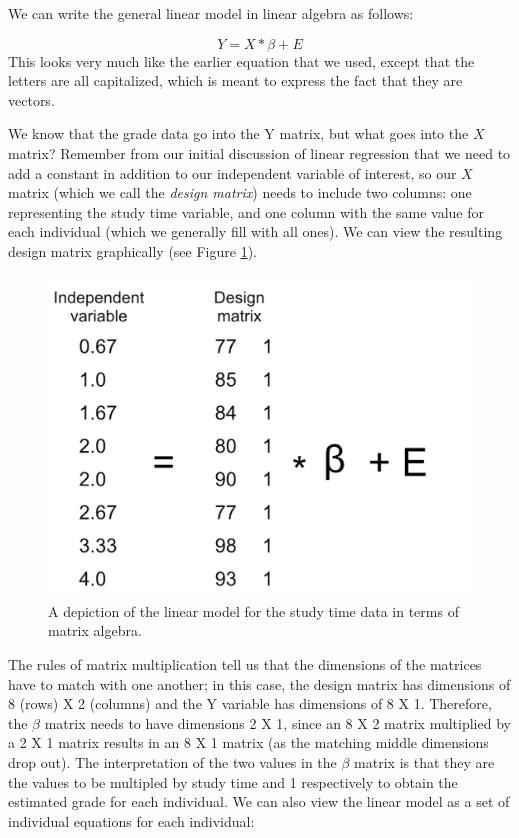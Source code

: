 \documentclass[12pt,]{book}
\theoremstyle{definition}
\theoremstyle{definition}
\theoremstyle{definition}
\theoremstyle{remark}
\begin{document}
We can write the general linear model in linear algebra as follows:

\[
Y = X*\beta + E
\]
This looks very much like the earlier equation that we used, except that the letters are all capitalized, which is meant to express the fact that they are vectors.

We know that the grade data go into the Y matrix, but what goes into the \(X\) matrix? Remember from our initial discussion of linear regression that we need to add a constant in addition to our independent variable of interest, so our \(X\) matrix (which we call the \emph{design matrix}) needs to include two columns: one representing the study time variable, and one column with the same value for each individual (which we generally fill with all ones). We can view the resulting design matrix graphically (see Figure \ref{fig:GLMmatrix}).

\begin{figure}
\includegraphics[width=16.67in]{images/glm_matrix} \caption{A depiction of the linear model for the study time data in terms of matrix algebra.}\label{fig:GLMmatrix}
\end{figure}

The rules of matrix multiplication tell us that the dimensions of the matrices have to match with one another; in this case, the design matrix has dimensions of 8 (rows) X 2 (columns) and the Y variable has dimensions of 8 X 1. Therefore, the \(\beta\) matrix needs to have dimensions 2 X 1, since an 8 X 2 matrix multiplied by a 2 X 1 matrix results in an 8 X 1 matrix (as the matching middle dimensions drop out). The interpretation of the two values in the \(\beta\) matrix is that they are the values to be multipled by study time and 1 respectively to obtain the estimated grade for each individual. We can also view the linear model as a set of individual equations for each individual:
\end{document}
